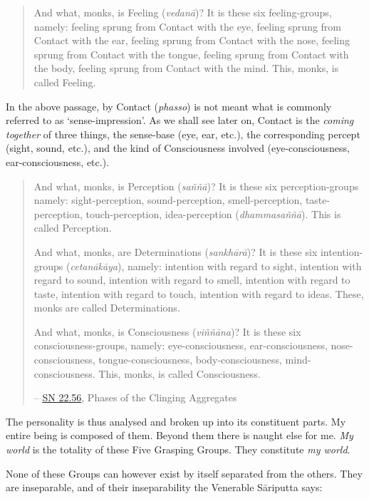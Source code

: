 \begin{quote}
And what, monks, is Feeling (\textit{vedanā})? It is these six feeling-groups, namely: feeling sprung from Contact with the eye, feeling sprung from Contact with the ear, feeling sprung from Contact with the nose, feeling sprung from Contact with the tongue, feeling sprung from Contact with the body, feeling sprung from Contact with the mind. This, monks, is called Feeling.
\end{quote}

In the above passage, by Contact (\textit{phasso}) is not meant what is commonly referred to as `sense-impression'. As we shall see later on, Contact is the \emph{coming together} of three things, the sense-base (eye, ear, etc.), the corresponding percept (sight, sound, etc.), and the kind of Consciousness involved (eye-consciousness, ear-consciousness, etc.).

\begin{quote}
And what, monks, is Perception (\textit{saññā})? It is these six perception-groups namely: sight-perception, sound-perception, smell-perception, taste-perception, touch-perception, idea-perception (\textit{dhammasaññā}). This is called Perception.

And what, monks, are Determinations (\textit{sankhārā})? It is these six intention-groups (\textit{cetanākāya}), namely: intention with regard to sight, intention with regard to sound, intention with regard to smell, intention with regard to taste, intention with regard to touch, intention with regard to ideas. These, monks are called Determinations.

And what, monks, is Consciousness (\textit{viññāna})? It is these six consciousness-groups, namely: eye-consciousness, ear-consciousness, nose-consciousness, tongue-consciousness, body-consciousness, mind-consciousness. This, monks, is called Consciousness.

 -- \href{https://suttacentral.net/sn22.56/en/bodhi}{SN 22.56}, Phases of the Clinging Aggregates
\end{quote}

The personality is thus analysed and broken up into its constituent parts. My entire being is composed of them. Beyond them there is naught else for me. \emph{My world} is the totality of these Five Grasping Groups. They constitute \emph{my world}.

None of these Groups can however exist by itself separated from the others. They are inseparable, and of their inseparability the Venerable Sāriputta says:

